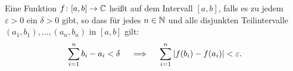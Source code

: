 Eine Funktion $f\colon[a,b]\to \mathbb{C}$ heißt  auf dem Intervall $[a,b]$, falls es zu jedem $\varepsilon>0$ ein $\delta>0$ gibt, so dass für jedes $n\in\mathbb{N}$ und alle disjunkten Teilintervalle $(a_1,b_1),\dots,(a_n,b_n)$ in $[a,b]$ gilt: 
\begin{equation*}
    \sum_{i=1}^n b_i - a_i <\delta \quad \implies \quad \sum_{i=1}^n \left|f(b_i) - f(a_i)\right|<\varepsilon.
\end{equation*}